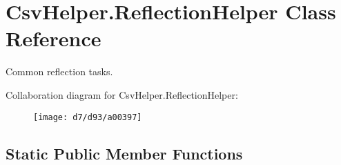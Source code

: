 \hypertarget{a00129}{\section{Csv\-Helper.\-Reflection\-Helper Class Reference}
\label{a00129}
}


Common reflection tasks.  




Collaboration diagram for Csv\-Helper.\-Reflection\-Helper\-:
\nopagebreak
\begin{figure}[H]
\begin{center}
\leavevmode
\texttt{[image: d7/d93/a00397]}
\end{center}
\end{figure}
\subsection*{Static Public Member Functions}
